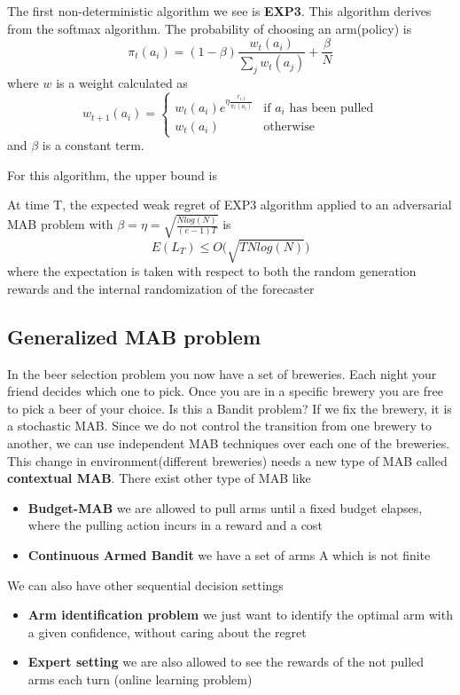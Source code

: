 \documentclass[../main.tex]{subfiles}
\begin{document}
The first non-deterministic algorithm we see is \textbf{EXP3}.
This algorithm derives from the softmax algorithm.
The probability of choosing an arm(policy) is
\begin{equation}
    \pi_t(a_i) = (1-\beta) \frac{w_t(a_i)}{\sum_j w_t(a_j)} + \frac{\beta}{N}
\end{equation}
where $w$ is a weight calculated as
\begin{equation*}
    w_{t+1}(a_i) =
    \begin{cases}
        w_t(a_i)e^{\eta \frac{r_{i,t}}{\pi_t(a_i)}} & \text{if $a_i$ has been pulled} \\
        w_t(a_i)                                    & \text{otherwise}
    \end{cases}
\end{equation*}
and $\beta$ is a constant term.
\par \noindent
For this algorithm, the upper bound is
\begin{theorem}
    At time T, the expected weak regret of EXP3 algorithm applied to an adversarial MAB problem with $\beta = \eta = \sqrt{\frac{Nlog(N)}{(e-1)T}}$ is
    \begin{equation*}
        E(L_T) \leq O\big( \sqrt{TNlog(N)} \big)
    \end{equation*}
    where the expectation is taken with respect to both the random generation rewards and the internal randomization of the forecaster
\end{theorem}

\subsection{Generalized MAB problem}
In the beer selection problem you now have a set of breweries. Each night your friend decides which one to pick. Once you are in a specific brewery you are free to pick a beer of your choice.
Is this a Bandit problem?
If we fix the brewery, it is a stochastic MAB. Since we do not control the transition from one brewery to another, we can use independent MAB techniques over each one of the breweries. This change in environment(different breweries) needs a new type of MAB called \textbf{contextual MAB}. There exist other type of MAB like
\begin{itemize}
    \item \textbf{Budget-MAB} we are allowed to pull arms until a fixed budget elapses, where the pulling action incurs in a reward and a cost
    \item \textbf{Continuous Armed Bandit} we have a set of arms A which is not finite
\end{itemize}
We can also have other sequential decision settings
\begin{itemize}
    \item \textbf{Arm identification problem} we just want to identify the optimal arm with a given confidence, without caring about the regret
    \item \textbf{Expert setting} we are also allowed to see the rewards of the not pulled arms each turn (online learning problem)
\end{itemize}
\end{document}
